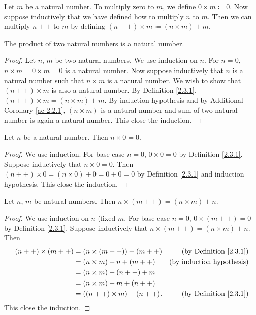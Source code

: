 \begin{definition}\label{2.3.1}
Let \(m\) be a natural number.
To multiply zero to \(m\), we define \(0 \times m \coloneqq 0\).
Now suppose inductively that we have defined how to multiply \(n\) to \(m\).
Then we can multiply \(n++\) to \(m\) by defining \((n++) \times m \coloneqq (n \times m) + m\).
\end{definition}

\begin{additional corollary}\label{ac 2.3.1}
The product of two natural numbers is a natural number.
\end{additional corollary}

\begin{proof}
Let \(n\), \(m\) be two natural numbers.
We use induction on \(n\).
For \(n = 0\), \(n \times m = 0 \times m = 0\) is a natural number.
Now suppose inductively that \(n\) is a natural number such that \(n \times m\) is a natural number.
We wish to show that \((n++) \times m\) is also a natural number.
By Definition \ref{2.3.1}, \((n++) \times m = (n \times m) + m\).
By induction hypothesis and by Additional Corollary \ref{ac 2.2.1}, \((n \times m)\) is a natural number and sum of two natural number is again a natural number.
This close the induction.
\end{proof}

\begin{additional corollary}\label{ac 2.3.2}
Let \(n\) be a natural number.
Then \(n \times 0 = 0\).
\end{additional corollary}

\begin{proof}
We use induction.
For base case \(n = 0\), \(0 \times 0 = 0\) by Definition \ref{2.3.1}.
Suppose inductively that \(n \times 0 = 0\).
Then \((n++) \times 0 = (n \times 0) + 0 = 0 + 0 = 0\) by Definition \ref{2.3.1} and induction hypothesis.
This close the induction.
\end{proof}

\begin{additional corollary}\label{ac 2.3.3}
Let \(n\), \(m\) be natural numbers.
Then \(n \times (m++) = (n \times m) + n\).
\end{additional corollary}

\begin{proof}
We use induction on \(n\) (fixed \(m\).
For base case \(n = 0\), \(0 \times (m++) = 0\) by Definition \ref{2.3.1}.
Suppose inductively that \(n \times (m++) = (n \times m) + n\).
Then
    \begin{align*}
        (n++) \times (m++)
        &= (n \times (m++)) + (m++) & \text{(by Definition \ref{2.3.1})} \\
        &= (n \times m) + n + (m++) & \text{(by induction hypothesis)} \\
        &= (n \times m) + (n++) + m \\
        &= (n \times m) + m + (n++) \\
        &= ((n++) \times m) + (n++). & \text{(by Definition \ref{2.3.1})}
    \end{align*}
This close the induction.
\end{proof}

